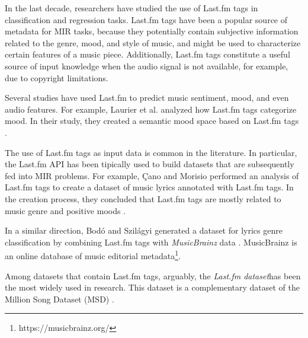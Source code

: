 \documentclass[sn-mathphys]{sn-jnl}%
\theoremstyle{thmstyleone}%
\theoremstyle{thmstyletwo}%
\theoremstyle{thmstylethree}%
\begin{document}
In the last decade, researchers have studied the use of Last.fm tags in classification and regression tasks.
Last.fm tags have been a popular source of metadata for MIR tasks,
because they potentially contain subjective information related to the genre, mood, and style of music,
and might be used to characterize certain features of a music piece.
Additionally, Last.fm tags constitute a useful source of input knowledge when the audio signal is not available,
for example, due to copyright limitations.


Several studies have used Last.fm to predict music sentiment, mood, and even audio features.
For example, Laurier et al. analyzed how Last.fm tags categorize mood.
In their study, they created a semantic mood space based on Last.fm tags \cite{laurier2009music}.




The use of Last.fm tags as input data is common in the literature.
In particular, the Last.fm API has been tipically used to build datasets that are subsequently fed into MIR problems.
For example, {\c{C}}ano and Morisio performed an analysis of Last.fm tags to create a dataset of music
lyrics annotated with Last.fm tags.
In the creation process, they concluded that Last.fm tags are mostly related to music genre
and positive moods \cite{ccano2017music}.

In a similar direction, Bod{\'o} and Szil{\'a}gyi generated a dataset for lyrics genre classification
by combining Last.fm tags with \emph{MusicBrainz} data \cite{bodo2018connecting}.
MusicBrainz is an online database of music editorial metadata\footnote[1]{https://musicbrainz.org/}.

Among datasets that contain Last.fm tags, arguably, the \emph{Last.fm dataset}\footnotemark[2] has been the most widely used in research.
This dataset is a complementary dataset of the Million Song Dataset (MSD) \cite{Bertin-Mahieux2011}.

\end{document}
